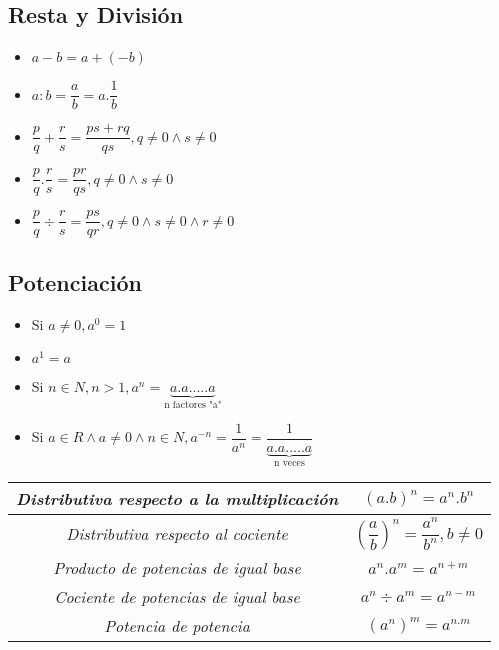 \documentclass[10pt]{article}
\begin{document}
\subsection{Resta y División}
\begin{multicols}{2}
\begin{itemize}
\item $a-b = a+(-b)$
\item $a:b = \dfrac{a}{b} = a.\dfrac{1}{b}$
\item $\dfrac{p}{q}+\dfrac{r}{s}=\dfrac{ps+rq}{qs}, q \not = 0 \land s \not = 0$
\item $\dfrac{p}{q}.\dfrac{r}{s}=\dfrac{pr}{qs}, q \not = 0 \land s \not = 0$
\item $\dfrac{p}{q} \div \dfrac{r}{s}=\dfrac{ps}{qr}, q \not = 0 \land s \not = 0 \land r \not = 0$
\end{itemize}
\end{multicols}
\subsection{Potenciación}
\begin{multicols}{2}
\begin{itemize}
\item Si $a \not = 0, a^0 = 1$
\item $a^1 = a$
\item Si $n \in N, n>1, a^n = \underbrace{a.a. ... . a}_\text{n factores "a"}$
\item Si $a \in R \land a \not = 0 \land n \in N, a^{-n} = \dfrac{1}{a^n}=\dfrac{1}{\underbrace{a.a. ... . a}_\text{n veces}}$
\end{itemize}
\end{multicols}
\begin{table}[h]
\begin{center}
\begin{tabular}{|c|c|}
\hline
\textit{Distributiva respecto a la multiplicación}&$(a.b)^n=a^n.b^n$\\
\hline
\textit{Distributiva respecto al cociente}&$\left(\dfrac{a}{b}\right)^n = \dfrac{a^n}{b^n}, b \not = 0$\\
\hline
\textit{Producto de potencias de igual base}&$a^n.a^m = a^{n+m}$\\
\hline
\textit{Cociente de potencias de igual base}&$a^n \div a^m = a^{n-m}$\\
\hline
\textit{Potencia de potencia}&$\left(a^n\right)^m = a^{n.m}$\\
\hline
\end{tabular}
\end{center}
\end{table}
\newpage
\end{document}
